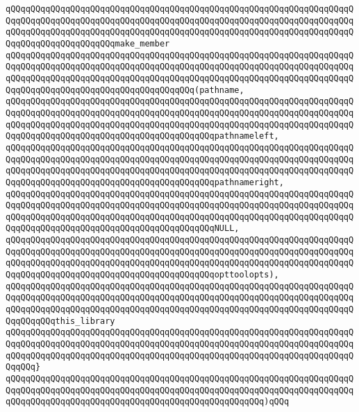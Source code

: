 \verb|qQQqqQQqqQQqqQQqqQQqqQQqqQQqqQQqqQQqqQQqqQQqqQQqqQQqqQQqqQQqqQQqqQQqqQQqqQQqqQQqqQQqqQQqqQQqqQQqqQQqqQQqqQQqqQQqqQQqqQQqqQQqqQQqqQQqqQQqqQQqqQQqqQQqqQQqqQQqqQQqqQQqqQQqqQQqqQQqqQQqqQQqqQQqqQQqqQQqqQQqqQQqqQQqqQQqqQQqqQQqqQQqqQQqqQQqmake_member|\newline
\verb|qQQqqQQqqQQqqQQqqQQqqQQqqQQqqQQqqQQqqQQqqQQqqQQqqQQqqQQqqQQqqQQqqQQqqQQqqQQqqQQqqQQqqQQqqQQqqQQqqQQqqQQqqQQqqQQqqQQqqQQqqQQqqQQqqQQqqQQqqQQqqQQqqQQqqQQqqQQqqQQqqQQqqQQqqQQqqQQqqQQqqQQqqQQqqQQqqQQqqQQqqQQqqQQqqQQqqQQqqQQqqQQqqQQqqQQqqQQqqQQqqQQqqQQq(pathname,|\newline
\verb|qQQqqQQqqQQqqQQqqQQqqQQqqQQqqQQqqQQqqQQqqQQqqQQqqQQqqQQqqQQqqQQqqQQqqQQqqQQqqQQqqQQqqQQqqQQqqQQqqQQqqQQqqQQqqQQqqQQqqQQqqQQqqQQqqQQqqQQqqQQqqQQqqQQqqQQqqQQqqQQqqQQqqQQqqQQqqQQqqQQqqQQqqQQqqQQqqQQqqQQqqQQqqQQqqQQqqQQqqQQqqQQqqQQqqQQqqQQqqQQqqQQqqQQqqQQqpathnameleft,|\newline
\verb|qQQqqQQqqQQqqQQqqQQqqQQqqQQqqQQqqQQqqQQqqQQqqQQqqQQqqQQqqQQqqQQqqQQqqQQqqQQqqQQqqQQqqQQqqQQqqQQqqQQqqQQqqQQqqQQqqQQqqQQqqQQqqQQqqQQqqQQqqQQqqQQqqQQqqQQqqQQqqQQqqQQqqQQqqQQqqQQqqQQqqQQqqQQqqQQqqQQqqQQqqQQqqQQqqQQqqQQqqQQqqQQqqQQqqQQqqQQqqQQqqQQqqQQqqQQqpathnameright,|\newline
\verb|qQQqqQQqqQQqqQQqqQQqqQQqqQQqqQQqqQQqqQQqqQQqqQQqqQQqqQQqqQQqqQQqqQQqqQQqqQQqqQQqqQQqqQQqqQQqqQQqqQQqqQQqqQQqqQQqqQQqqQQqqQQqqQQqqQQqqQQqqQQqqQQqqQQqqQQqqQQqqQQqqQQqqQQqqQQqqQQqqQQqqQQqqQQqqQQqqQQqqQQqqQQqqQQqqQQqqQQqqQQqqQQqqQQqqQQqqQQqqQQqqQQqqQQqqQQqNULL,|\newline
\verb|qQQqqQQqqQQqqQQqqQQqqQQqqQQqqQQqqQQqqQQqqQQqqQQqqQQqqQQqqQQqqQQqqQQqqQQqqQQqqQQqqQQqqQQqqQQqqQQqqQQqqQQqqQQqqQQqqQQqqQQqqQQqqQQqqQQqqQQqqQQqqQQqqQQqqQQqqQQqqQQqqQQqqQQqqQQqqQQqqQQqqQQqqQQqqQQqqQQqqQQqqQQqqQQqqQQqqQQqqQQqqQQqqQQqqQQqqQQqqQQqqQQqqQQqqQQqopttoolopts),|\newline
\verb|qQQqqQQqqQQqqQQqqQQqqQQqqQQqqQQqqQQqqQQqqQQqqQQqqQQqqQQqqQQqqQQqqQQqqQQqqQQqqQQqqQQqqQQqqQQqqQQqqQQqqQQqqQQqqQQqqQQqqQQqqQQqqQQqqQQqqQQqqQQqqQQqqQQqqQQqqQQqqQQqqQQqqQQqqQQqqQQqqQQqqQQqqQQqqQQqqQQqqQQqqQQqqQQqqQQqqQQqqQQqthis_library|\newline
\verb|qQQqqQQqqQQqqQQqqQQqqQQqqQQqqQQqqQQqqQQqqQQqqQQqqQQqqQQqqQQqqQQqqQQqqQQqqQQqqQQqqQQqqQQqqQQqqQQqqQQqqQQqqQQqqQQqqQQqqQQqqQQqqQQqqQQqqQQqqQQqqQQqqQQqqQQqqQQqqQQqqQQqqQQqqQQqqQQqqQQqqQQqqQQqqQQqqQQqqQQqqQQqqQQqqQQqqQQq}|\newline
\verb|qQQqqQQqqQQqqQQqqQQqqQQqqQQqqQQqqQQqqQQqqQQqqQQqqQQqqQQqqQQqqQQqqQQqqQQqqQQqqQQqqQQqqQQqqQQqqQQqqQQqqQQqqQQqqQQqqQQqqQQqqQQqqQQqqQQqqQQqqQQqqQQqqQQqqQQqqQQqqQQqqQQqqQQqqQQqqQQqqQQqqQQqqQQqqQQq)qQQq|\newline
